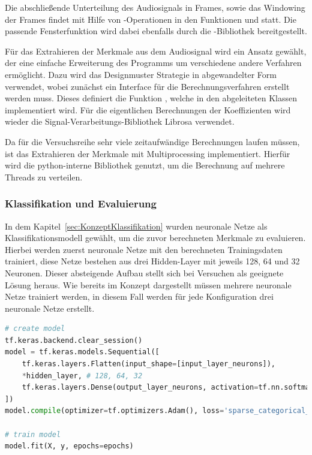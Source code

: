 Die abschließende Unterteilung des Audiosignals
in Frames, sowie das Windowing der Frames findet mit Hilfe von -Operationen in den Funktionen  und  statt.
Die passende Fensterfunktion wird dabei ebenfalls durch die -Bibliothek bereitgestellt.

Für das Extrahieren der Merkmale aus dem Audiosignal wird ein Ansatz gewählt, der eine einfache Erweiterung des Programms um verschiedene andere Verfahren ermöglicht.
Dazu wird das Designmuster Strategie in abgewandelter Form verwendet, wobei zunächst ein Interface für die Berechnungsverfahren erstellt werden muss.
Dieses definiert die Funktion , welche in den abgeleiteten Klassen implementiert wird.
Für die eigentlichen Berechnungen der Koeffizienten wird wieder die Signal-Verarbeitungs-Bibliothek Librosa verwendet.


Da für die Versuchsreihe sehr viele zeitaufwändige Berechnungen laufen müssen, ist das Extrahieren der Merkmale mit Multiprocessing implementiert.
Hierfür wird die python-interne Bibliothek  genutzt, um die Berechnung auf mehrere Threads zu verteilen.



\subsubsection{Klassifikation und Evaluierung}
In dem Kapitel~\ref{sec:KonzeptKlassifikation} wurden neuronale Netze als Klassifikationsmodell gewählt, um die zuvor berechneten Merkmale zu evaluieren.
Hierbei werden zuerst neuronale Netze mit den berechneten Trainingsdaten trainiert, diese Netze bestehen aus drei Hidden-Layer mit jeweils 128, 64 und 32 Neuronen.
Dieser absteigende Aufbau stellt sich bei Versuchen als geeignete Lösung heraus.
Wie bereits im Konzept dargestellt müssen mehrere neuronale Netze trainiert werden, in diesem Fall werden für jede Konfiguration drei neuronale Netze erstellt.

\begin{lstlisting}[language=Python,numbers=none,caption=Erstellen und Trainieren eines neuronalen Netzes,label=lst-nn]
# create model
tf.keras.backend.clear_session()
model = tf.keras.models.Sequential([
    tf.keras.layers.Flatten(input_shape=[input_layer_neurons]),
    *hidden_layer, # 128, 64, 32
    tf.keras.layers.Dense(output_layer_neurons, activation=tf.nn.softmax),
])
model.compile(optimizer=tf.optimizers.Adam(), loss='sparse_categorical_crossentropy', metrics=['accuracy'])

# train model
model.fit(X, y, epochs=epochs)
\end{lstlisting}

